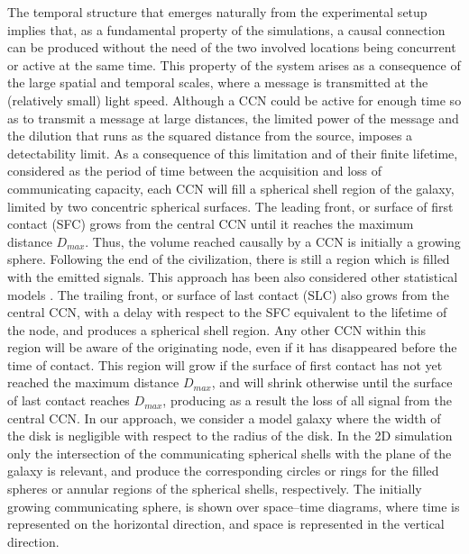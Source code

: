 \documentclass[crop]{CSLB}
\newcommand{\ceti}{CCN}
\begin{document}

The temporal structure that emerges naturally from the experimental
setup implies that,
as a fundamental property of the simulations,
a causal connection can be produced without the need of the two
involved locations being concurrent or active at the same time.
%
This property of the system arises as a
consequence of the large spatial and temporal scales, where a message
is transmitted at the (relatively small) light speed.
%
Although a \ceti{} could be active for enough time so as to transmit a
message at large distances, the limited power of the message and the
dilution that runs as the squared distance from the source, imposes a
detectability limit.
%
As a consequence of this limitation and of their finite lifetime,
considered as the period of time between the acquisition and loss of
communicating capacity, each \ceti{} will fill a spherical shell
region of the galaxy, limited by two concentric spherical surfaces.
%
The leading front, or surface of first contact (SFC) grows from the
central \ceti{} until it reaches the maximum distance $D_{max}$.
%
Thus, the volume reached causally by a \ceti{} is initially a growing
sphere.
%
Following the end of the civilization, there is still a region which
is filled with the emitted signals.
%
This approach has been also considered other statistical models
\citep[e.g., ][]{smith_broadcasting_2009, grimaldi_signal_2017, Grimaldi2018}.
%
The trailing front, or surface of last contact (SLC) also grows from
the central \ceti{}, with a delay with respect to the SFC equivalent
to the lifetime of the node, and produces a spherical shell region.
%
Any other \ceti{} within this region will be aware of the originating
node, even if it has disappeared before the time of contact.
%
This region will grow if the surface of first contact has not yet
reached the maximum distance $D_{max}$, and will shrink otherwise
until the surface of last contact reaches $D_{max}$, producing as a
result the loss of all signal from the central \ceti{}.
%
In our approach, we consider a model galaxy where the width of the
disk is negligible with respect to the radius of the disk.
%
In the 2D simulation only the intersection of the communicating
spherical shells with the plane of the galaxy is relevant, and produce
the corresponding circles or rings for the filled spheres or annular
regions of the spherical shells, respectively.
%
The initially growing communicating sphere, is shown over space--time
diagrams, where time is represented on the horizontal direction, and
space is represented in the vertical direction.
\end{document}
